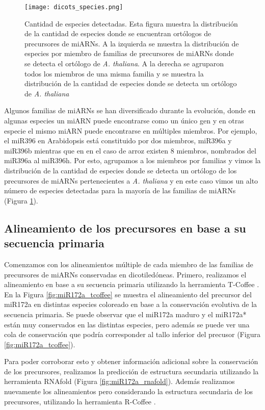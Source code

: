 \begin{figure}[htbp!]
    \centering    
    \texttt{[image: dicots\_species.png]}
    \caption[Especies detectadas]{Cantidad de especies detectadas.
    Esta figura muestra la distribución de la cantidad de especies donde se encuentran ortólogos de precursores de miARNs.
    A la izquierda se muestra la distribución de especies por miembro de familias de precursores de miARNs donde se detecta el ortólogo de \textit{A. thaliana}.
    A la derecha se agruparon todos los miembros de una misma familia y se muestra la distribución de la cantidad de especies donde se detecta un ortólogo de \textit{A. thaliana}}
    \label{fig:dicots_species}
\end{figure}

Algunos familias de miARNs se han diversificado durante la evolución, donde en algunas especies un miARN puede encontrarse como un único gen y en otras especie el mismo miARN puede encontrarse en múltiples miembros.
Por ejemplo, el miR396 en Arabidopsis está constituido por dos miembros, miR396a y miR396b mientras que en en el caso de arroz existen 8 miembros, nombrados del miR396a al miR396h.
Por esto, agrupamos a los miembros por familias y vimos la distribución de la cantidad de especies donde se detecta un ortólogo de los precursores de miARNs pertenecientes a \textit{A. thaliana} y en este caso vimos un alto número de especies detectadas para la mayoría de las familias de miARNs (Figura \ref{fig:dicots_species}).

\subsection{Alineamiento de los precursores en base a su secuencia primaria}

Comenzamos con los alineamientos múltiple de cada miembro de las familias de precursores de miARNs conservadas en dicotiledóneas.
Primero, realizamos el alineamiento en base a su secuencia primaria utilizando la herramienta T-Coffee \citep{pmid10964570}.
En la Figura \ref{fig:miR172a_tcoffee} se muestra el alineamiento del precursor del miR172a en distintas especies coloreado en base a la conservación evolutiva de la secuencia primaria.
Se puede observar que el miR172a maduro y el miR172a* están muy conservados en las distintas especies, pero además se puede ver una cola de conservación que podría corresponder al tallo inferior del precusor (Figura \ref{fig:miR172a_tcoffee}).

Para poder corroborar esto y obtener información adicional sobre la conservación de los precursores, realizamos la predicción de estructura secundaria utilizando la herramienta RNAfold \citep{pmid22115189} (Figura \ref{fig:miR172a_rnafold}).
Además realizamos nuevamente los alineamientos pero considerando la estructura secundaria de los precursores, utilizando la herramienta R-Coffee \citep{pmid18292307}.

